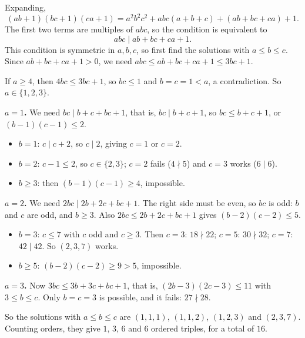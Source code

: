 Expanding,
\[(ab+1)(bc+1)(ca+1)=a^2b^2c^2+abc(a+b+c)+(ab+bc+ca)+1 .\]
The first two terms are multiples of $abc$, so the condition is equivalent to
\[abc \mid ab+bc+ca+1 .\]
This condition is symmetric in $a,b,c$, so first find the solutions with $a\le b\le c$. Since $ab+bc+ca+1>0$, we need $abc\le ab+bc+ca+1\le 3bc+1$.

If $a\ge4$, then $4bc\le3bc+1$, so $bc\le1$ and $b=c=1<a$, a contradiction. So $a\in\{1,2,3\}$.

\textbf{$a=1$.} We need $bc\mid b+c+bc+1$, that is, $bc\mid b+c+1$, so $bc\le b+c+1$, or $(b-1)(c-1)\le2$.
\begin{itemize}
\item $b=1$: $c\mid c+2$, so $c\mid2$, giving $c=1$ or $c=2$.
\item $b=2$: $c-1\le2$, so $c\in\{2,3\}$; $c=2$ fails ($4\nmid5$) and $c=3$ works ($6\mid6$).
\item $b\ge3$: then $(b-1)(c-1)\ge4$, impossible.
\end{itemize}

\textbf{$a=2$.} We need $2bc\mid 2b+2c+bc+1$. The right side must be even, so $bc$ is odd: $b$ and $c$ are odd, and $b\ge3$. Also $2bc\le2b+2c+bc+1$ gives $(b-2)(c-2)\le5$.
\begin{itemize}
\item $b=3$: $c\le7$ with $c$ odd and $c\ge3$. Then $c=3$: $18\nmid22$; $c=5$: $30\nmid32$; $c=7$: $42\mid42$. So $(2,3,7)$ works.
\item $b\ge5$: $(b-2)(c-2)\ge9>5$, impossible.
\end{itemize}

\textbf{$a=3$.} Now $3bc\le3b+3c+bc+1$, that is, $(2b-3)(2c-3)\le11$ with $3\le b\le c$. Only $b=c=3$ is possible, and it fails: $27\nmid28$.

So the solutions with $a\le b\le c$ are $(1,1,1)$, $(1,1,2)$, $(1,2,3)$ and $(2,3,7)$. Counting orders, they give $1$, $3$, $6$ and $6$ ordered triples, for a total of $\boxed{16}$.
